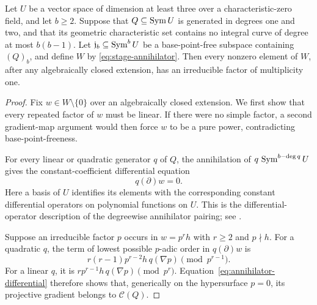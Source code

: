 \begin{lemma}\label{lem:simple-factor}
Let \(U\) be a vector space of dimension at least three over a
characteristic-zero field, and let \(b\ge2\).
Suppose that \(Q\subseteq\operatorname{Sym} U\) is generated in degrees one
and two, and that its geometric characteristic set contains no
integral curve of degree at most \(b(b-1)\).
Let \(\mathfrak j_b\subseteq\operatorname{Sym}^b U\) be a base-point-free
subspace containing \((Q)_b\), and define \(W\) by
\eqref{eq:stage-annihilator}.
Then every nonzero element of \(W\), after any algebraically closed
extension, has an irreducible factor of multiplicity one.
\end{lemma}

\begin{proof}
Fix \(w\in W\setminus\{0\}\) over an algebraically closed extension.
We first show that every repeated factor of \(w\) must be linear.
If there were no simple factor, a second gradient-map argument would
then force \(w\) to be a pure power, contradicting base-point-freeness.

For every linear or quadratic generator \(q\) of \(Q\),
the annihilation of
\(q\,\operatorname{Sym}^{b-\deg q}U\) gives the constant-coefficient
differential equation
\begin{equation}\label{eq:annihilator-differential}
 q(\partial)w=0.
\end{equation}
Here a basis of \(U\) identifies its elements with the corresponding
constant differential operators on polynomial functions on \(U\).
This is the differential-operator description of the degreewise
annihilator pairing; see \cite[pp.~1082--1083, Definitions~1--2
and~(5a)]{EmsalemIarrobino95}.

Suppose an irreducible factor \(p\) occurs in \(w=p^r h\) with
\(r\ge2\) and \(p\nmid h\). For a quadratic \(q\), the term of
lowest possible \(p\)-adic order in \(q(\partial)w\) is
\[
 r(r-1)p^{r-2}h\,q(\nabla p)
       \pmod{p^{r-1}}.
\]
For a linear \(q\), it is
\(rp^{r-1}h\,q(\nabla p)\pmod{p^r}\).
Equation~\eqref{eq:annihilator-differential} therefore shows that,
generically on the hypersurface \(p=0\), its projective gradient
belongs to \(\mathcal C(Q)\).


\end{proof}
